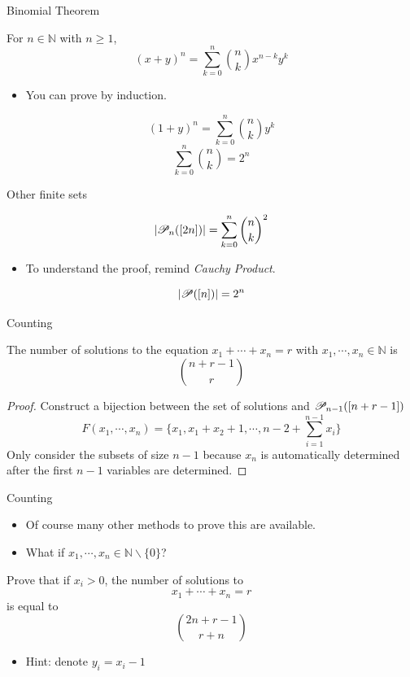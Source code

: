 \begin{frame}{Binomial Theorem}
    \begin{theorem}
        For $n\in\mathbb{N}$ with $n\geq 1$, $$(x+y)^n=\sum_{k=0}^n\binom{n}{k}x^{n-k}y^{k}$$
    \end{theorem}
    \begin{itemize}
        \item You can prove by induction.
    \end{itemize}
    \begin{corollary}
        $$(1+y)^n=\sum_{k=0}^n\binom{n}{k}y^k$$
        $$\sum_{k=0}^n\binom{n}{k}=2^n$$
    \end{corollary}
\end{frame}

\begin{frame}{Other finite sets}
    \begin{theorem}
        $$|\mathscr{P}_{n}({[2n]})|=\sum_{k=0}^n\binom{n}{k}^2$$
    \end{theorem}
    \begin{itemize}
        \item To understand the proof, remind \emph{Cauchy Product}.
    \end{itemize}
    \begin{theorem}
        $$|\mathscr{P}({[n]})|=2^n$$
    \end{theorem}
\end{frame}

\begin{frame}{Counting}
    \begin{theorem}
        The number of solutions to the equation $x_1+\cdots+x_n=r$ with $x_1,\cdots,x_n\in\mathbb{N}$ is $$\binom{n+r-1}{r}$$
    \end{theorem}
    \begin{proof}
        Construct a bijection between the set of solutions and $\mathscr{P}_{n-1}({[n+r-1]})$
        $$F(x_1,\cdots,x_n)=\{x_1,x_1+x_2+1,\cdots,n-2+\sum_{i=1}^{n-1}x_i\}$$
        Only consider the subsets of size $n-1$ because $x_n$ is automatically determined after the first $n-1$ variables are determined.
    \end{proof}
\end{frame}

\begin{frame}{Counting}
    \begin{itemize}
        \item Of course many other methods to prove this are available.
        \item What if $x_1,\cdots,x_n\in\mathbb{N}\backslash\{0\}$?
    \end{itemize}
    \begin{example}
        Prove that if $x_i>0$, the number of solutions to $$x_1+\cdots+x_n=r$$ is equal to $$\binom{2n+r-1}{r+n}$$
    \end{example}
    \begin{itemize}
        \item Hint: denote $y_i=x_i-1$
    \end{itemize}
\end{frame}

